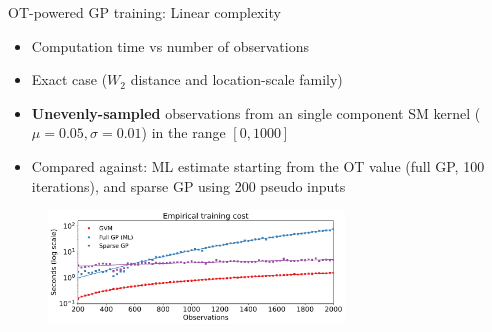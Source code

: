 \documentclass[pdf,aspectratio=169,10pt]{beamer}
\begin{document}
\begin{frame}[plain]{OT-powered GP training: Linear complexity }

\begin{itemize}
    \item Computation time vs number of observations
    \item Exact case ($W_2$ distance and location-scale family)
    \item \textbf{Unevenly-sampled} observations from an single component SM kernel ($\mu=0.05, \sigma=0.01$) in the range $[0,1000]$
    \item Compared against: ML estimate starting from the OT value (full GP, 100 iterations), and sparse GP using 200 pseudo inputs
\end{itemize}

\begin{figure}[ht]
\centering
  \includegraphics[width=0.7\textwidth]{../img/exp2.pdf}
  \label{fig:comp_cost}
\end{figure} 
    
\end{frame}
\end{document}
